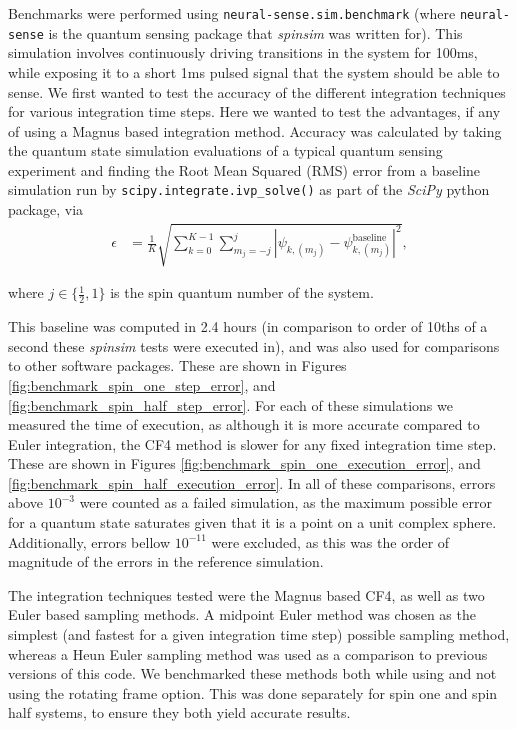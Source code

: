 \documentclass{jors}
\begin{document}
		Benchmarks were performed using \texttt{neural-sense.sim.benchmark} (where \texttt{neural-sense}\cite{alexander-tritt-monash_alexander-tritt-monashneural-sense_2020} is the quantum sensing package that \emph{spinsim} was written for).
		This simulation involves continuously driving transitions in the system for 100ms, while exposing it to a short 1ms pulsed signal that the system should be able to sense.
		We first wanted to test the accuracy of the different integration techniques for various integration time steps.
		Here we wanted to test the advantages, if any of using a Magnus based integration method.
		Accuracy was calculated by taking the quantum state simulation evaluations of a typical quantum sensing experiment and finding the Root Mean Squared (RMS) error from a baseline simulation run by \texttt{scipy.integrate.ivp\_solve()} as part of the \emph{SciPy} python package, via
		\begin{align}
			\epsilon &= \frac{1}{K}\sqrt{\sum_{k = 0}^{K - 1}\sum_{m_j = -j}^j|\psi_{k, (m_j)} - \psi_{k, (m_j)}^{\textrm{baseline}}|^2},\label{eq:error}
		\end{align}

		where \(j \in \{\frac12, 1\}\) is the spin quantum number of the system.

		This baseline was computed in 2.4 hours (in comparison to order of 10ths of a second these \emph{spinsim} tests were executed in), and was also used for comparisons to other software packages.
		These are shown in Figures \ref{fig:benchmark_spin_one_step_error}, and \ref{fig:benchmark_spin_half_step_error}.
		For each of these simulations we measured the time of execution, as although it is more accurate compared to Euler integration, the CF4 method is slower for any fixed integration time step.
		These are shown in Figures \ref{fig:benchmark_spin_one_execution_error}, and \ref{fig:benchmark_spin_half_execution_error}.
		In all of these comparisons, errors above \(10^{-3}\) were counted as a failed simulation, as the maximum possible error for a quantum state saturates given that it is a point on a unit complex sphere.
		Additionally, errors bellow \(10^{-11}\) were excluded, as this was the order of magnitude of the errors in the reference simulation.

		The integration techniques tested were the Magnus based CF4, as well as two Euler based sampling methods.
		A midpoint Euler method was chosen as the simplest (and fastest for a given integration time step)  possible sampling method, whereas a Heun Euler sampling method was used as a comparison to previous versions of this code.
		We benchmarked these methods both while using and not using the rotating frame option.
		This was done separately for spin one and spin half systems, to ensure they both yield accurate results.
\end{document}
